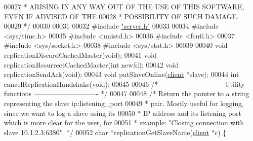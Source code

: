\begin{DoxyCode}
00027 \textcolor{comment}{ * ARISING IN ANY WAY OUT OF THE USE OF THIS SOFTWARE, EVEN IF ADVISED OF THE}
00028 \textcolor{comment}{ * POSSIBILITY OF SUCH DAMAGE.}
00029 \textcolor{comment}{ */}
00030 
00031 
00032 \textcolor{preprocessor}{#}\textcolor{preprocessor}{include} \hyperlink{server_8h}{"server.h"}
00033 
00034 \textcolor{preprocessor}{#}\textcolor{preprocessor}{include} \textcolor{preprocessor}{<}\textcolor{preprocessor}{sys}\textcolor{preprocessor}{/}\textcolor{preprocessor}{time}\textcolor{preprocessor}{.}\textcolor{preprocessor}{h}\textcolor{preprocessor}{>}
00035 \textcolor{preprocessor}{#}\textcolor{preprocessor}{include} \textcolor{preprocessor}{<}\textcolor{preprocessor}{unistd}\textcolor{preprocessor}{.}\textcolor{preprocessor}{h}\textcolor{preprocessor}{>}
00036 \textcolor{preprocessor}{#}\textcolor{preprocessor}{include} \textcolor{preprocessor}{<}\textcolor{preprocessor}{fcntl}\textcolor{preprocessor}{.}\textcolor{preprocessor}{h}\textcolor{preprocessor}{>}
00037 \textcolor{preprocessor}{#}\textcolor{preprocessor}{include} \textcolor{preprocessor}{<}\textcolor{preprocessor}{sys}\textcolor{preprocessor}{/}\textcolor{preprocessor}{socket}\textcolor{preprocessor}{.}\textcolor{preprocessor}{h}\textcolor{preprocessor}{>}
00038 \textcolor{preprocessor}{#}\textcolor{preprocessor}{include} \textcolor{preprocessor}{<}\textcolor{preprocessor}{sys}\textcolor{preprocessor}{/}\textcolor{preprocessor}{stat}\textcolor{preprocessor}{.}\textcolor{preprocessor}{h}\textcolor{preprocessor}{>}
00039 
00040 \textcolor{keywordtype}{void} replicationDiscardCachedMaster(\textcolor{keywordtype}{void});
00041 \textcolor{keywordtype}{void} replicationResurrectCachedMaster(\textcolor{keywordtype}{int} newfd);
00042 \textcolor{keywordtype}{void} replicationSendAck(\textcolor{keywordtype}{void});
00043 \textcolor{keywordtype}{void} putSlaveOnline(\hyperlink{structclient}{client} *slave);
00044 \textcolor{keywordtype}{int} cancelReplicationHandshake(\textcolor{keywordtype}{void});
00045 
00046 \textcolor{comment}{/* --------------------------- Utility functions ---------------------------- */}
00047 
00048 \textcolor{comment}{/* Return the pointer to a string representing the slave ip:listening\_port}
00049 \textcolor{comment}{ * pair. Mostly useful for logging, since we want to log a slave using its}
00050 \textcolor{comment}{ * IP address and its listening port which is more clear for the user, for}
00051 \textcolor{comment}{ * example: "Closing connection with slave 10.1.2.3:6380". */}
00052 \textcolor{keywordtype}{char} *replicationGetSlaveName(\hyperlink{structclient}{client} *c) \{

\end{DoxyCode}

